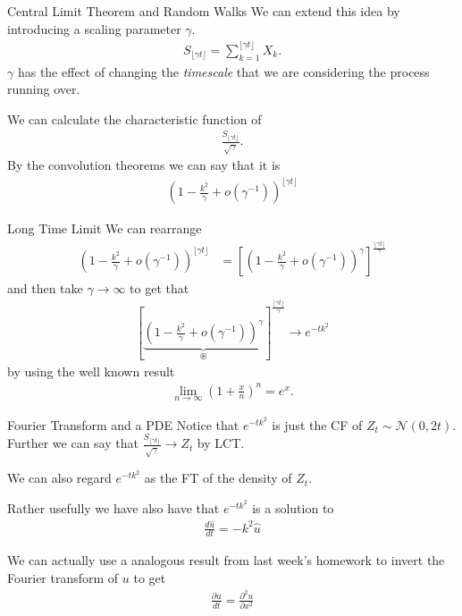 \documentclass[pdf]{beamer}
\newcommand{\lra}{\longrightarrow}
\begin{document}
\begin{frame}{Central Limit Theorem and Random Walks}
    We can extend this idea by introducing a scaling parameter $ \gamma $.
    \begin{align}
        S_{\lfloor \gamma t \rfloor} = \sum_{k=1}^{\lfloor \gamma t \rfloor} X_k.
    \end{align}
    $ \gamma $ has the effect of changing the \emph{timescale} that we are considering the process running over.
    
    We can calculate the characteristic function of 
    \begin{align}
       \frac{S_{\lfloor \gamma t \rfloor}}{\sqrt{\gamma }}.
    \end{align}
    By the convolution theorems we can say that it is
    \begin{align}
        \left( 1- \frac{k^2}{\gamma} + o(\gamma^{-1}) \right)^{\lfloor \gamma t \rfloor}
    \end{align}
\end{frame}

\begin{frame}{Long Time Limit}
    We can rearrange
    \begin{align}
        \left( 1- \frac{k^2}{\gamma} + o(\gamma^{-1}) \right)^{\lfloor \gamma t \rfloor}
        &= \left[ \left( 1- \frac{k^2}{\gamma} + o(\gamma^{-1}) \right)^\gamma \right]^\frac{{\lfloor \gamma t \rfloor}}{\gamma}
    \end{align}
    and then take $ \gamma \lra \infty $ to get that
    \begin{align}
    \left[ \underbrace{\left( 1- \frac{k^2}{\gamma} + o(\gamma^{-1}) \right)^\gamma}_{\circledast} \right]^\frac{{\lfloor \gamma t \rfloor}}{\gamma} \lra e^{-tk^2}
    \end{align}
    by using the well known result
    \begin{align}
        \lim_{n \lra \infty} \left(1 + \frac{x}{n}\right)^n = e^x.
    \end{align}
\end{frame}


\begin{frame}{Fourier Transform and a PDE}
    Notice that $ e^{-tk^2} $ is just the CF of $Z_t \sim \mathcal{N}(0,2t) $. Further we can say that $ \frac{S_{\lfloor \gamma t \rfloor}}{\sqrt{\gamma}} \lra Z_t $ by LCT.
    
    
    We can also regard $ e^{-tk^2} $ as the FT of the density of $ Z_t $.
    
    Rather usefully we have also have that $ e^{-tk^2} $ is a solution to 
    \begin{align}
        \frac{d\hat{u}}{dt} = -k^2\hat{u}
    \end{align}
    
    We can actually use a analogous result from last week's homework to invert the Fourier transform of $ u $ to get
    \begin{align}
        \frac{\partial u}{dt} = \frac{\partial^2 u}{\partial x^2}
    \end{align}
\end{frame}
\end{document}
